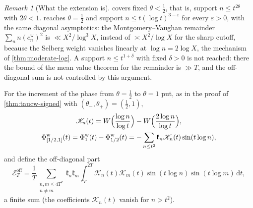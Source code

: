 \documentclass[11pt,a4paper]{article}
\numberwithin{equation}{section}
\theoremstyle{definition}
\theoremstyle{remark}
\newtheorem{remark}[theorem]{Remark}
\newcommand{\dd}{\,\mathrm dt}
\begin{document}
\begin{remark}[What the extension is]\label{rem:taucw-beyond}
 covers fixed $\theta<\frac12$, that is, support $n\le t^{2\theta}$ with $2\theta<1$.  reaches $\theta=\frac12$ and support $n\le t(\log t)^{3-\varepsilon}$ for every $\varepsilon>0$, with the same diagonal asymptotics: the Montgomery--Vaughan remainder $\sum_nn(c^{\mathrm w}_n)^2$ is $\ll X^2/\log^3X$, instead of $\asymp X^2/\log X$ for the sharp cutoff, because the Selberg weight vanishes linearly at $\log n=2\log X$, the mechanism of \cref{thm:moderate-log}. A support $n\le t^{1+\delta}$ with fixed $\delta>0$ is not reached: there the bound of the mean value theorem for the remainder is $\gg T$, and the off-diagonal sum is not controlled by this argument.
\end{remark}

For the increment of the phase from $\theta=\frac12$ to $\theta=1$ put, as in the proof of \cref{thm:taucw-signed} with $(\theta_-,\theta_+)=(\frac12,1)$,
\begin{equation}\label{eq:taucw-inc1-def}
\begin{gathered}
\mathscr K_n(t)=W\Bigl(\frac{\log n}{\log t}\Bigr)-W\Bigl(\frac{2\log n}{\log t}\Bigr),\\
\Phi^{\mathrm w}_{[1/2,1]}(t)=\Phi^{\mathrm w}_1(t)-\Phi^{\mathrm w}_{1/2}(t)=-\sum_{n\le t^2}\mathfrak k_n\mathscr K_n(t)\sin(t\log n),
\end{gathered}
\end{equation}
and define the off-diagonal part
\begin{equation}\label{eq:taucw-inc1-off}
\mathscr E^{\mathrm{off}}_T=\frac1T\sum_{\substack{n,m\le4T^2\\n\ne m}}\mathfrak k_n\mathfrak k_m\int_T^{2T}\mathscr K_n(t)\mathscr K_m(t)\sin(t\log n)\sin(t\log m)\dd ,
\end{equation}
a finite sum (the coefficients $\mathscr K_n(t)$ vanish for $n>t^2$).
\end{document}
